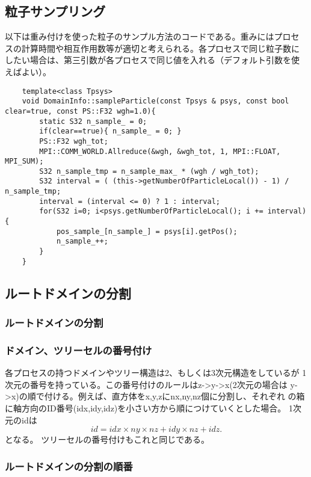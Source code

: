 \subsection{粒子サンプリング}

以下は重み付けを使った粒子のサンプル方法のコードである。重みにはプロセ
スの計算時間や相互作用数等が適切と考えられる。各プロセスで同じ粒子数に
したい場合は、第三引数が各プロセスで同じ値を入れる（デフォルト引数を使
えばよい）。

\begin{lstlisting}
    template<class Tpsys>
    void DomainInfo::sampleParticle(const Tpsys & psys, const bool clear=true, const PS::F32 wgh=1.0){
        static S32 n_sample_ = 0;
        if(clear==true){ n_sample_ = 0; }
        PS::F32 wgh_tot;
        MPI::COMM_WORLD.Allreduce(&wgh, &wgh_tot, 1, MPI::FLOAT, MPI_SUM);
        S32 n_sample_tmp = n_sample_max_ * (wgh / wgh_tot);
        S32 interval = ( (this->getNumberOfParticleLocal()) - 1) / n_sample_tmp;
        interval = (interval <= 0) ? 1 : interval;
        for(S32 i=0; i<psys.getNumberOfParticleLocal(); i += interval){
            pos_sample_[n_sample_] = psys[i].getPos();
            n_sample_++;
        }
    }
\end{lstlisting}

\subsection{ルートドメインの分割}

\subsubsection{ルートドメインの分割}

\subsubsection{ドメイン、ツリーセルの番号付け}

各プロセスの持つドメインやツリー構造は2、もしくは3次元構造をしているが
1次元の番号を持っている。この番号付けのルールはz->y->x(2次元の場合は
y->x)の順で付ける。例えば、直方体をx,y,zにnx,ny,nz個に分割し、それぞれ
の箱に軸方向のID番号(idx,idy,idz)を小さい方から順につけていくとした場合。
1次元のidは
\begin{equation}
id = idx \times ny \times nz + idy \times nz + idz.
\end{equation}
となる。
ツリーセルの番号付けもこれと同じである。

\subsubsection{ルートドメインの分割の順番}

